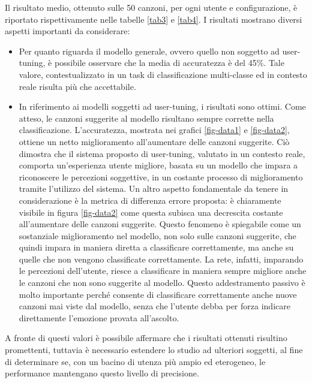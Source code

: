 \documentclass[11pt]{report}
\begin{document}
Il risultato medio, ottenuto sulle 50 canzoni, per ogni utente e configurazione, è riportato rispettivamente nelle tabelle \ref{tab3} e \ref{tab4}. I risultati mostrano diversi aspetti importanti da considerare:
\begin{itemize}
    \item Per quanto riguarda il modello generale, ovvero quello non soggetto ad user-tuning, è possibile osservare che la media di accuratezza è del 45\%. Tale valore, contestualizzato in un task di classificazione multi-classe ed in contesto reale risulta più che accettabile. 
    
    \item In riferimento ai modelli soggetti ad user-tuning, i risultati sono ottimi. Come atteso, le canzoni suggerite al modello risultano sempre corrette nella classificazione. L'accuratezza, mostrata nei grafici \ref{fig-data1} e \ref{fig-data2}, ottiene un netto miglioramento all'aumentare delle canzoni suggerite. Ciò dimostra che il sistema proposto di user-tuning, valutato in un contesto reale, comporta un'esperienza utente migliore, basata su un modello che impara a riconoscere le percezioni soggettive, in un costante processo di miglioramento tramite l'utilizzo del sistema. Un altro aspetto fondamentale da tenere in considerazione è la metrica di differenza errore proposta: è chiaramente visibile in figura \ref{fig-data2} come questa subisca una decrescita costante all'aumentare delle canzoni suggerite. Questo fenomeno è spiegabile come un sostanziale miglioramento nel modello, non solo sulle canzoni suggerite, che quindi impara in maniera diretta a classificare correttamente, ma anche su quelle che non vengono classificate correttamente. La rete, infatti, imparando le percezioni dell'utente, riesce a classificare in maniera sempre migliore anche le canzoni che non sono suggerite al modello. Questo addestramento passivo è molto importante perché consente di classificare correttamente anche nuove canzoni mai viste dal modello, senza che l'utente debba per forza indicare direttamente l'emozione provata all'ascolto.
\end{itemize}

A fronte di questi valori è possibile affermare che i risultati ottenuti risultino promettenti, tuttavia è necessario estendere lo studio ad ulteriori soggetti, al fine di determinare se, con un bacino di utenza più ampio ed eterogeneo, le performance mantengano questo livello di precisione.


\newpage
\end{document}
